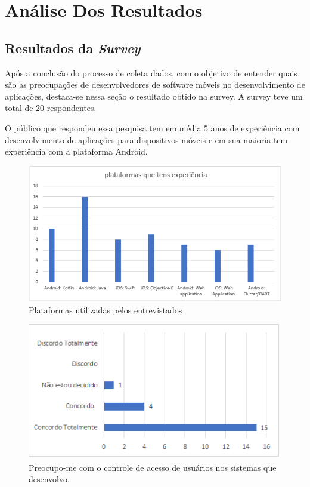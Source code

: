  \chapter{\label{chap:intro}Análise Dos Resultados}
 




\section{Resultados da \textit{Survey}}

Após a conclusão do processo de coleta dados, com o objetivo de entender quais são as preocupações de desenvolvedores de software móveis no desenvolvimento de aplicações, destaca-se nessa seção o resultado obtido na survey. A survey teve um total de 20 respondentes.

O público que respondeu essa pesquisa tem em média 5 anos de experiência com desenvolvimento de aplicações  para dispositivos móveis e em sua maioria tem experiência com a plataforma Android. 

\begin{figure}
    \centering
    \includegraphics[scale=0.9]{fig/plataformas.PNG}
    \caption{Plataformas utilizadas pelos entrevistados}
    \label{fig:my_label}
\end{figure}



\begin{figure}[t]
\centering
\includegraphics[scale=0.8]{figuras das questoes/1.1.PNG}
\caption{Preocupo-me com o controle de acesso de usuários nos sistemas que desenvolvo.}
\end{figure}


